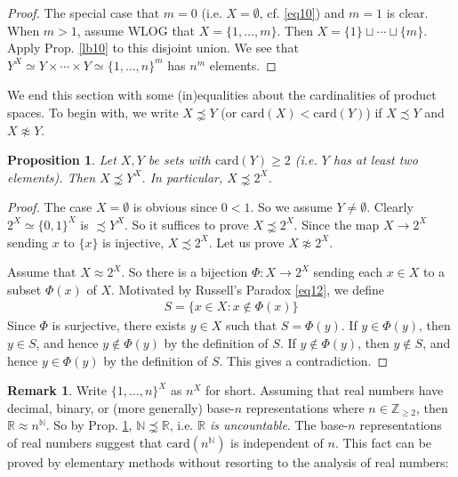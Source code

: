 \documentclass[12pt,b5paper,notitlepage]{article}
\theoremstyle{definition}
\newtheorem{rem}[df]{Remark}
\theoremstyle{plain}
\newtheorem{pp}[df]{Proposition}
\newcommand{\Nbb}{\mathbb N}
\newcommand{\Zbb}{\mathbb Z}
\newcommand{\Rbb}{\mathbb R}
\newcommand{\card}{\mathrm{card}}
\numberwithin{equation}{section}
\begin{document}
\begin{proof}
The special case that $m=0$ (i.e. $X=\emptyset$, cf. \eqref{eq10}) and $m=1$ is clear. When $m>1$, assume WLOG that $X=\{1,\dots,m\}$. Then $X=\{1\}\sqcup\cdots\sqcup\{m\}$. Apply Prop. \ref{lb10} to this disjoint union. We see that $Y^X\simeq Y\times \cdots\times Y\simeq\{1,\dots,n\}^m$ has $n^m$ elements.
\end{proof}



We end this section with some (in)equalities about the cardinalities of product spaces. To begin with, we write $X\precnsim Y$ (or $\card(X)<\card(Y)$) if $X\precsim Y$ and $X\napprox Y$.

\begin{pp}\label{lb14}
Let $X,Y$ be sets with $\card(Y)\geq 2$ (i.e. $Y$ has at least two elements). Then $X\precnsim Y^X$. In particular, $X\precnsim 2^X$.
\end{pp}

\begin{proof}
The case $X=\emptyset$ is obvious since $0<1$. So we assume $Y\neq\emptyset$. Clearly $2^X\simeq\{0,1\}^X$ is $\precsim Y^X$. So it suffices to prove $X\precnsim 2^X$. Since the map $X\rightarrow 2^X$ sending $x$ to $\{x\}$ is injective, $X\precsim 2^X$. Let us prove $X\napprox 2^X$.

Assume that $X\approx 2^X$. So there is a bijection $\Phi:X\rightarrow 2^X$ sending each $x\in X$ to a subset $\Phi(x)$ of $X$. Motivated by Russell's Paradox \eqref{eq12}, we define
\begin{align*}
S=\{x\in X:x\notin \Phi(x)\}
\end{align*}
Since $\Phi$ is surjective, there exists $y\in X$ such that $S=\Phi(y)$. If $y\in\Phi(y)$, then $y\in S$, and hence $y\notin \Phi(y)$ by the definition of $S$. If $y\notin\Phi(y)$, then $y\notin S$, and hence $y\in\Phi(y)$ by the definition of $S$. This gives a contradiction.
\end{proof}


\begin{rem}
Write $\{1,\dots,n\}^X$ as $n^X$ for short.  Assuming that real numbers have decimal, binary, or (more generally) base-$n$ representations where $n\in\Zbb_{\geq 2}$, then  $\Rbb\approx n^{\Nbb}$. So by Prop. \ref{lb14}, $\Nbb\precnsim\Rbb$, i.e. \textit{$\Rbb$ is uncountable}. The base-$n$ representations of real numbers suggest that $\card(n^\Nbb)$ is independent of $n$. This fact can be proved by elementary methods without  resorting to the analysis of real numbers:
\end{rem}
\end{document}
